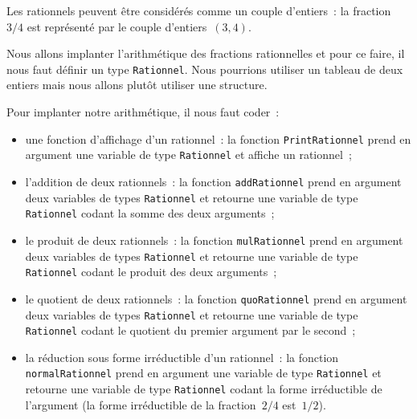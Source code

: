 \begin{exercice}
Les rationnels peuvent \^etre consid\'er\'es comme un couple d'entiers~:
la fraction~$3/4$ est repr\'esent\'e par le couple d'entiers~$(3,4)$. 
\par
Nous allons  implanter l'arithm\'etique  des fractions rationnelles et
pour ce faire, il nous faut d\'efinir un type \texttt{Rationnel}. Nous
pourrions  utiliser un  tableau  de  deux   entiers mais  nous  allons
plut\^ot utiliser une structure.
\par
Pour implanter notre arithm\'etique, il nous faut coder~:
\begin{itemize}
\item une fonction d'affichage d'un rationnel~: la fonction
  \texttt{PrintRationnel} prend en argument une variable de type
  \texttt{Rationnel} et affiche un rationnel~;
\item l'addition de deux rationnels~: la fonction \texttt{addRationnel} prend
  en argument deux variables de types \texttt{Rationnel} et retourne
  une variable de type \texttt{Rationnel} codant la somme des deux
  arguments~;
\item le produit de deux rationnels~: la fonction \texttt{mulRationnel} prend
  en argument deux variables de types \texttt{Rationnel} et retourne
  une variable de type \texttt{Rationnel} codant le produit des deux
  arguments~;
\item le quotient de deux rationnels~: la fonction \texttt{quoRationnel} prend
  en argument deux variables de types \texttt{Rationnel} et retourne
  une variable de type \texttt{Rationnel} codant le quotient du
  premier argument par le second~;
\item la r\'eduction sous forme irr\'eductible d'un rationnel~: la
  fonction \texttt{normalRationnel} prend en argument une variable de type
  \texttt{Rationnel} et retourne une variable de type
  \texttt{Rationnel} codant la forme irr\'eductible de l'argument (la
  forme irr\'eductible de la fraction~$2/4$ est~$1/2$).
\end{itemize}
\ifcorrection
\begin{correction}

\end{correction}
\fi
\end{exercice}
